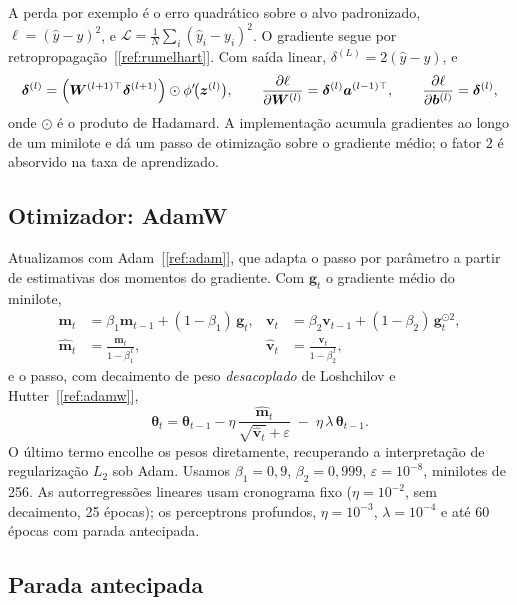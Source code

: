 \documentclass[12pt,a4paper,oneside]{article}
\newcommand{\C}[1]{[\ref{#1}]}
\begin{document}
A perda por exemplo é o erro quadrático sobre o alvo padronizado,
$\ell=(\widehat{y}-y)^2$, e $\mathcal{L}=\frac1N\sum_i(\widehat{y}_i-y_i)^2$.
O gradiente segue por retropropagação~\C{ref:rumelhart}. Com saída linear,
$\delta^{(L)}=2(\widehat{y}-y)$, e
\begin{equation}
\bm\delta^{(l)} = \Bigl(\bm W^{(l+1)\top}\bm\delta^{(l+1)}\Bigr)\odot\phi'\!\bigl(\bm z^{(l)}\bigr),
\qquad
\frac{\partial\ell}{\partial \bm W^{(l)}} = \bm\delta^{(l)}\bm a^{(l-1)\top},
\qquad
\frac{\partial\ell}{\partial \bm b^{(l)}} = \bm\delta^{(l)} ,
\label{eq:backprop}
\end{equation}
onde $\odot$ é o produto de Hadamard. A implementação acumula gradientes ao
longo de um minilote e dá um passo de otimização sobre o gradiente médio;
o fator $2$ é absorvido na taxa de aprendizado.

\subsection{Otimizador: AdamW}

Atualizamos com Adam~\C{ref:adam}, que adapta o passo por parâmetro a
partir de estimativas dos momentos do gradiente. Com $\bm g_t$ o gradiente
médio do minilote,
\begin{align}
\bm m_t &= \beta_1\bm m_{t-1} + (1-\beta_1)\,\bm g_t, &
\bm v_t &= \beta_2\bm v_{t-1} + (1-\beta_2)\,\bm g_t^{\odot 2},\\
\widehat{\bm m}_t &= \frac{\bm m_t}{1-\beta_1^{\,t}}, &
\widehat{\bm v}_t &= \frac{\bm v_t}{1-\beta_2^{\,t}},
\end{align}
e o passo, com decaimento de peso \emph{desacoplado} de Loshchilov e
Hutter~\C{ref:adamw},
\begin{equation}
\bm\theta_t = \bm\theta_{t-1} - \eta\,\frac{\widehat{\bm m}_t}{\sqrt{\widehat{\bm v}_t}+\varepsilon}
\;-\; \eta\,\lambda\,\bm\theta_{t-1}.
\label{eq:adamw}
\end{equation}
O último termo encolhe os pesos diretamente, recuperando a interpretação
de regularização $L_2$ sob Adam. Usamos $\beta_1=0{,}9$, $\beta_2=0{,}999$,
$\varepsilon=10^{-8}$, minilotes de 256. As autorregressões lineares usam
cronograma fixo ($\eta=10^{-2}$, sem decaimento, 25 épocas); os perceptrons
profundos, $\eta=10^{-3}$, $\lambda=10^{-4}$ e até 60 épocas com parada
antecipada.

\subsection{Parada antecipada}
\end{document}
